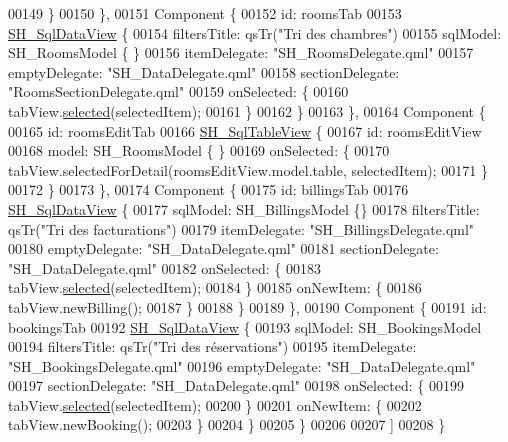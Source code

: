 \begin{DoxyCode}
00149             \}
00150         \},
00151         Component \{
00152             \textcolor{keywordtype}{id}: roomsTab
00153             \hyperlink{classSH__SqlDataView}{SH\_SqlDataView} \{
00154                 filtersTitle: qsTr(\textcolor{stringliteral}{"Tri des chambres"})
00155                 sqlModel: SH\_RoomsModel \{ \}
00156                 itemDelegate: \textcolor{stringliteral}{"SH\_RoomsDelegate.qml"}
00157                 emptyDelegate: \textcolor{stringliteral}{"SH\_DataDelegate.qml"}
00158                 sectionDelegate: \textcolor{stringliteral}{"RoomsSectionDelegate.qml"}
00159                 onSelected: \{
00160                     tabView.\hyperlink{classSH__SqlDataView_a95366e3f65b183e8c82381e90b5ddc94}{selected}(selectedItem);
00161                 \}
00162             \}
00163         \},
00164         Component \{
00165             \textcolor{keywordtype}{id}: roomsEditTab
00166             \hyperlink{classSH__SqlTableView}{SH\_SqlTableView} \{
00167                 \textcolor{keywordtype}{id}: roomsEditView
00168                 model: SH\_RoomsModel \{ \}
00169                 onSelected: \{
00170                     tabView.selectedForDetail(roomsEditView.model.table, selectedItem);
00171                 \}
00172             \}
00173         \},
00174         Component \{
00175             \textcolor{keywordtype}{id}: billingsTab
00176             \hyperlink{classSH__SqlDataView}{SH\_SqlDataView} \{
00177                 sqlModel: SH\_BillingsModel \{\}
00178                 filtersTitle: qsTr(\textcolor{stringliteral}{"Tri des facturations"})
00179                 itemDelegate: \textcolor{stringliteral}{"SH\_BillingsDelegate.qml"}
00180                 emptyDelegate: \textcolor{stringliteral}{"SH\_DataDelegate.qml"}
00181                 sectionDelegate: \textcolor{stringliteral}{"SH\_DataDelegate.qml"}
00182                 onSelected: \{
00183                     tabView.\hyperlink{classSH__SqlDataView_a95366e3f65b183e8c82381e90b5ddc94}{selected}(selectedItem);
00184                 \}
00185                 onNewItem: \{
00186                     tabView.newBilling();
00187                 \}
00188             \}
00189         \},
00190         Component \{
00191             \textcolor{keywordtype}{id}: bookingsTab
00192             \hyperlink{classSH__SqlDataView}{SH\_SqlDataView} \{
00193                 sqlModel: SH\_BookingsModel
00194                 filtersTitle: qsTr(\textcolor{stringliteral}{"Tri des réservations"})
00195                 itemDelegate: \textcolor{stringliteral}{"SH\_BookingsDelegate.qml"}
00196                 emptyDelegate: \textcolor{stringliteral}{"SH\_DataDelegate.qml"}
00197                 sectionDelegate: \textcolor{stringliteral}{"SH\_DataDelegate.qml"}
00198                 onSelected: \{
00199                     tabView.\hyperlink{classSH__SqlDataView_a95366e3f65b183e8c82381e90b5ddc94}{selected}(selectedItem);
00200                 \}
00201                 onNewItem: \{
00202                     tabView.newBooking();
00203                 \}
00204             \}
00205         \}
00206 
00207     ]
00208 \}
\end{DoxyCode}
